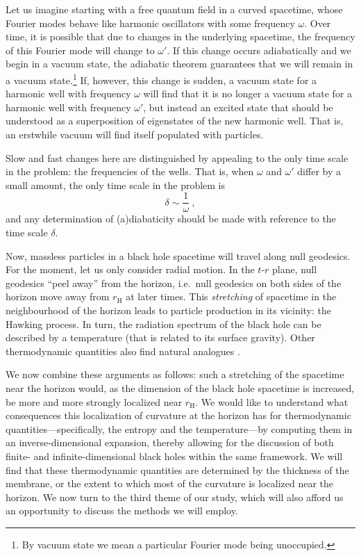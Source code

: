 \documentclass[a4paper,11pt]{article}
\newcommand{\rH}{r_{\text{H}}}
\begin{document}
Let us imagine starting with a free quantum field in a curved spacetime, whose Fourier modes behave like harmonic oscillators with some frequency $\omega$. Over time, it is possible that due to changes in the underlying spacetime, the frequency of this Fourier mode will change to $\omega'$. If this change occurs adiabatically and we begin in a vacuum state, the adiabatic theorem guarantees that we will remain in a vacuum state.\footnote{By vacuum state we mean a particular Fourier mode being unoccupied.} If, however, this change is sudden, a vacuum state for a harmonic well with frequency $\omega$ will find that it is no longer a vacuum state for a harmonic well with frequency $\omega'$, but instead an excited state that should be understood as a superposition of eigenstates of the new harmonic well. That is, an erstwhile vacuum will find itself populated with particles.

Slow and fast changes here are distinguished by appealing to the only time scale in the problem: the frequencies of the wells. That is, when $\omega$ and $\omega'$ differ by a small amount, the only time scale in the problem is
\begin{equation}
\delta \sim \frac{1}{\omega} \ ,
\end{equation}
and any determination of (a)diabaticity should be made with reference to the time scale $\delta$.

Now, massless particles in a black hole spacetime will travel along null geodesics. For the moment, let us only consider radial motion. In the $t$-$r$ plane, null geodesics ``peel away'' from the horizon, i.e.~null geodesics on both sides of the horizon move away from $\rH$ at later times. This \emph{stretching} of spacetime in the neighbourhood of the horizon leads to particle production in its vicinity: the Hawking process. In turn, the radiation spectrum of the black hole can be described by a temperature (that is related to its surface gravity). Other thermodynamic quantities also find natural analogues \cite{Wald:1999vt,Carlip:2014pma}.


We now combine these arguments as follows: such a stretching of the spacetime near the horizon would, as the dimension of the black hole spacetime is increased, be more and more strongly localized near $r_{\text{H}}$. We would like to understand what consequences this localization of curvature at the horizon has for thermodynamic quantities---specifically, the entropy and the temperature---by computing them in an inverse-dimensional expansion, thereby allowing for the discussion of both finite- and infinite-dimensional black holes within the same framework. We will find that these thermodynamic quantities are determined by the thickness of the membrane, or the extent to which most of the curvature is localized near the horizon. We now turn to the third theme of our study, which will also afford us an opportunity to discuss the methods we will employ.
\end{document}
